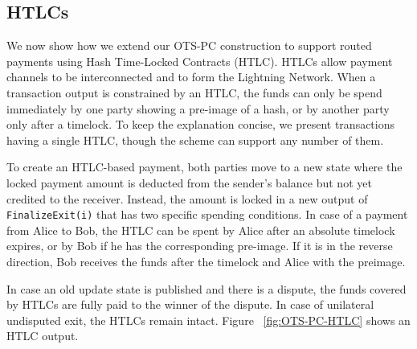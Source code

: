 \documentclass[11pt,a4paper]{article}
\newcommand{\txname}[1]{\texttt{#1}}
\begin{document}
\subsection{HTLCs}
\label{htlcs}

We now show how we extend our OTS-PC construction to support routed payments using Hash Time-Locked Contracts (HTLC). HTLCs allow payment channels to be interconnected and to form the Lightning Network. When a transaction output is constrained by an HTLC, the funds can only be spend immediately by one party showing a pre-image of a hash, or by another party only after a timelock. To keep the explanation concise, we present transactions having a single HTLC, though the scheme can support any number of them. 

To create an HTLC-based payment, both parties move to a new state where the locked payment amount is deducted from the sender’s balance but not yet credited to the receiver. Instead, the amount is locked in a new output of \txname{FinalizeExit(i)} that has two specific spending conditions. In case of a payment from Alice to Bob, the HTLC can be spent by Alice after an absolute timelock expires, or by Bob if he has the corresponding pre-image. If it is in the reverse direction, Bob receives the funds after the timelock and Alice with the preimage.

In case an old update state is published and there is a dispute, the funds covered by HTLCs are fully paid to the winner of the dispute. In case of unilateral undisputed exit, the HTLCs remain intact. Figure ~\ref{fig:OTS-PC-HTLC} shows an HTLC output.
\end{document}
